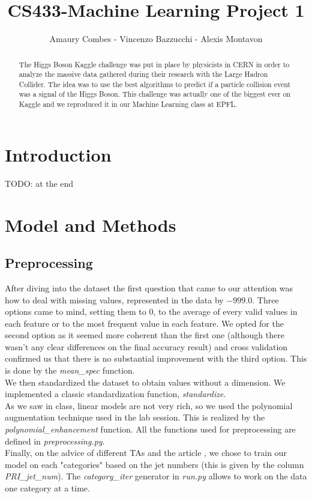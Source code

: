 \documentclass[10pt,conference,compsocconf]{IEEEtran}
\begin{document}
\title{CS433-Machine Learning Project 1}

\author{
  Amaury Combes - Vincenzo Bazzucchi - Alexis Montavon\\
}

\maketitle

\begin{abstract}
  The Higgs Boson Kaggle challenge was put in place by physicists in CERN in order to analyze the massive data gathered during their research with the Large Hadron Collider. The idea was to use the best algorithms to predict if a particle collision event was a signal of the Higgs Boson. This challenge was actually one of the biggest ever on Kaggle and we reproduced it in our Machine Learning class at EPFL.
\end{abstract}

\section{Introduction}

TODO: at the end

\section{Model and Methods}
\label{sec:model}
\subsection{Preprocessing}
After diving into the dataset the first question that came to our attention was how to deal with missing values, represented in the data by $-999.0$. Three options came to mind, setting them to $0$, to the average of every valid values in each feature or to the most frequent value in each feature. We opted for the second option as it seemed more coherent than the first one (although there wasn't any clear differences on the final accuracy result) and cross validation confirmed us that there is no substantial improvement with the third option. This is done by the \textit{mean\_spec} function.\\
We then standardized the dataset to obtain values without a dimension. We implemented a classic standardization function, \textit{standardize}.\\ As we saw in class, linear models are not very rich, so we used the polynomial augmentation technique used in the lab session. This is realized by the \textit{polynomial\_enhancement} function. All the functions used for preprocessing are defined in \textit{preprocessing.py}.\\
Finally, on the advice of different TAs and the article \cite{anderson04}, we chose to train our model on each "categories" based on the jet numbers (this is given by the column \textit{PRI\_jet\_num}). The \textit{category\_iter} generator in \textit{run.py} allows to work on the data one category at a time.
\end{document}
